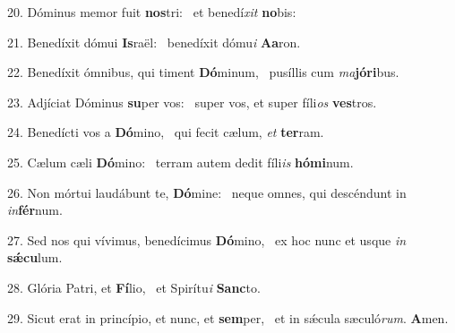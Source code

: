 20. Dóminus memor fuit \textbf{nos}tri: \ast\  et benedí\textit{xit} \textbf{no}bis:\

21. Benedíxit dómui \textbf{Is}raël: \ast\  benedíxit dómu\textit{i} \textbf{A}\textbf{a}ron.\

22. Benedíxit ómnibus, qui timent \textbf{Dó}minum, \ast\  pusíllis cum \textit{ma}\textbf{jó}\textbf{ri}bus.\

23. Adjíciat Dóminus \textbf{su}per vos: \ast\  super vos, et super fíli\textit{os} \textbf{ves}tros.\

24. Benedícti vos a \textbf{Dó}mino, \ast\  qui fecit cælum, \textit{et} \textbf{ter}ram.\

25. Cælum cæli \textbf{Dó}mino: \ast\  terram autem dedit fíli\textit{is} \textbf{hó}\textbf{mi}num.\

26. Non mórtui laudábunt te, \textbf{Dó}mine: \ast\  neque omnes, qui descéndunt in \textit{in}\textbf{fér}num.\

27. Sed nos qui vívimus, benedícimus \textbf{Dó}mino, \ast\  ex hoc nunc et usque \textit{in} \textbf{sǽ}\textbf{cu}lum.\

28. Glória Patri, et \textbf{Fí}lio, \ast\  et Spirítu\textit{i} \textbf{Sanc}to.\

29. Sicut erat in princípio, et nunc, et \textbf{sem}per, \ast\  et in sǽcula sæculó\textit{rum}. \textbf{A}men.\

